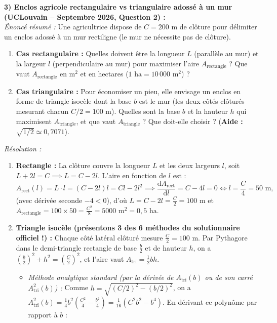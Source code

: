 \begin{exemple}
\medskip
\textbf{3) Enclos agricole rectangulaire vs triangulaire adossé à un mur (UCLouvain -- Septembre 2026, Question 2) :}\\
\emph{Énoncé résumé :} Une agricultrice dispose de $C = 200\text{ m}$ de clôture pour délimiter un enclos adossé à un mur rectiligne (le mur ne nécessite pas de clôture).
\begin{enumerate}[label=(\arabic*)]
    \item \textbf{Cas rectangulaire :} Quelles doivent être la longueur $L$ (parallèle au mur) et la largeur $l$ (perpendiculaire au mur) pour maximiser l'aire $A_{\text{rectangle}}$ ? Que vaut $A_{\text{rectangle}}$ en $\text{m}^2$ et en hectares ($1\text{ ha} = 10\,000\text{ m}^2$) ?
    \item \textbf{Cas triangulaire :} Pour économiser un pieu, elle envisage un enclos en forme de triangle isocèle dont la base $b$ est le mur (les deux côtés clôturés mesurant chacun $C/2 = 100\text{ m}$). Quelles sont la base $b$ et la hauteur $h$ qui maximisent $A_{\text{triangle}}$, et que vaut $A_{\text{triangle}}$ ? Que doit-elle choisir ? (\textbf{Aide :} $\sqrt{1/2} \simeq 0,7071$).
\end{enumerate}
\emph{Résolution :}
\begin{enumerate}[label=(\arabic*)]
    \item \textbf{Rectangle :} La clôture couvre la longueur $L$ et les deux largeurs $l$, soit $L + 2l = C \implies L = C - 2l$. L'aire en fonction de $l$ est :
    \[
        A_{\text{rect}}(l) = L\cdot l = (C - 2l)l = Cl - 2l^2 \implies \frac{\mathrm{d}A_{\text{rect}}}{\mathrm{d}l} = C - 4l = 0 \iff \boxed{l = \frac{C}{4} = 50\text{ m}},
    \]
    (avec dérivée seconde $-4 < 0$), d'où $\boxed{L = C - 2l = \frac{C}{2} = 100\text{ m}}$ et $\boxed{A_{\text{rectangle}} = 100 \times 50 = \frac{C^2}{8} = 5000\text{ m}^2 = 0,5\text{ ha}}$.
    \item \textbf{Triangle isocèle (présentons 3 des 6 méthodes du solutionnaire officiel !) :}
    Chaque côté latéral clôturé mesure $\frac{C}{2} = 100\text{ m}$. Par Pythagore dans le demi-triangle rectangle de base $\frac{b}{2}$ et de hauteur $h$, on a $\left(\frac{b}{2}\right)^2 + h^2 = \left(\frac{C}{2}\right)^2$, et l'aire vaut $A_{\text{tri}} = \frac{1}{2}bh$.
    \begin{itemize}
        \item \emph{Méthode analytique standard (par la dérivée de $A_{\text{tri}}(b)$ ou de son carré $A_{\text{tri}}^2(b)$) :} Comme $h = \sqrt{(C/2)^2 - (b/2)^2}$, on a $A_{\text{tri}}^2(b) = \frac{1}{4}b^2\left(\frac{C^2}{4} - \frac{b^2}{4}\right) = \frac{1}{16}(C^2 b^2 - b^4)$. En dérivant ce polynôme par rapport à $b$ :

\end{itemize}
\end{enumerate}
\end{exemple}
